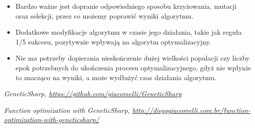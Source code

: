 \documentclass{classrep}
\begin{document}
\begin{itemize}
    \item Bardzo ważne jest dopranie odpowiedniego sposobu krzyżowania, mutacji oraz selekcji, przez co możemy poprawić wyniki algorytmu.
    \item Dodatkowe modyfikacje algorytmu w czasie jego działania, takie jak reguła 1/5 sukcesu, pozytywnie wpływają na algorytm optymalizacyjny.
    \item Nie ma potrzeby dopierania nieskończenie dużej wielkości populacji czy liczby epok potrzebnych do ukończenia procesu optymalizacyjnego, gdyż nie wpłynie to znacząco na wyniki, a może wydłużyć czas działania algorytmu.
\end{itemize}

\begin{thebibliography}{0}
    \textsl{GeneticSharp, \url{https://github.com/giacomelli/GeneticSharp}}
    
    \textsl{Function optimization with GeneticSharp, \url{http://diegogiacomelli.com.br/function-optimization-with-geneticsharp/}}

\end{thebibliography}
\end{document}
